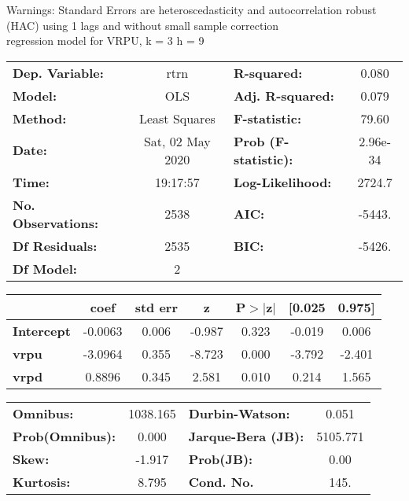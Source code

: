 Warnings: \newline
 [1] Standard Errors are heteroscedasticity and autocorrelation robust (HAC) using 1 lags and without small sample correction\\ 

regression model for VRPU, k = 3 h = 9\begin{center}
\begin{tabular}{lclc}
\toprule
\textbf{Dep. Variable:}    &       rtrn       & \textbf{  R-squared:         } &     0.080   \\
\textbf{Model:}            &       OLS        & \textbf{  Adj. R-squared:    } &     0.079   \\
\textbf{Method:}           &  Least Squares   & \textbf{  F-statistic:       } &     79.60   \\
\textbf{Date:}             & Sat, 02 May 2020 & \textbf{  Prob (F-statistic):} &  2.96e-34   \\
\textbf{Time:}             &     19:17:57     & \textbf{  Log-Likelihood:    } &    2724.7   \\
\textbf{No. Observations:} &        2538      & \textbf{  AIC:               } &    -5443.   \\
\textbf{Df Residuals:}     &        2535      & \textbf{  BIC:               } &    -5426.   \\
\textbf{Df Model:}         &           2      & \textbf{                     } &             \\
\bottomrule
\end{tabular}
\begin{tabular}{lcccccc}
                   & \textbf{coef} & \textbf{std err} & \textbf{z} & \textbf{P$> |$z$|$} & \textbf{[0.025} & \textbf{0.975]}  \\
\midrule
\textbf{Intercept} &      -0.0063  &        0.006     &    -0.987  &         0.323        &       -0.019    &        0.006     \\
\textbf{vrpu}      &      -3.0964  &        0.355     &    -8.723  &         0.000        &       -3.792    &       -2.401     \\
\textbf{vrpd}      &       0.8896  &        0.345     &     2.581  &         0.010        &        0.214    &        1.565     \\
\bottomrule
\end{tabular}
\begin{tabular}{lclc}
\textbf{Omnibus:}       & 1038.165 & \textbf{  Durbin-Watson:     } &    0.051  \\
\textbf{Prob(Omnibus):} &   0.000  & \textbf{  Jarque-Bera (JB):  } & 5105.771  \\
\textbf{Skew:}          &  -1.917  & \textbf{  Prob(JB):          } &     0.00  \\
\textbf{Kurtosis:}      &   8.795  & \textbf{  Cond. No.          } &     145.  \\
\bottomrule
\end{tabular}
\end{center}


